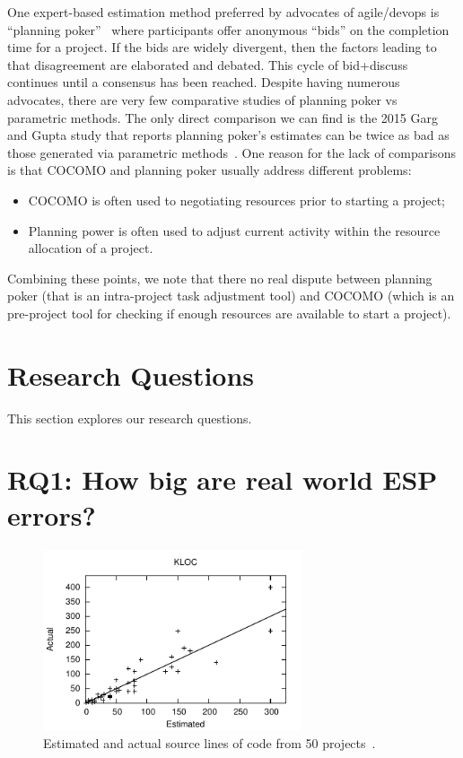 \documentclass[final,twocolumn]{elsarticle}
\newcommand{\bi}{\begin{itemize}[leftmargin=0.4cm]}
\newcommand{\ei}{\end{itemize}}
\theoremstyle{break}
\begin{document}
 One expert-based estimation method preferred by advocates of
 agile/devops is ``planning poker''~\cite{molokk08}
 where participants offer anonymous ``bids'' on the
 completion time for a project. If the bids are
 widely divergent, then the factors leading to that
 disagreement are elaborated and debated. This cycle
 of bid+discuss continues until a consensus has been
 reached.  Despite having numerous advocates,
 there are very few comparative studies of planning
 poker vs parametric methods. The only direct
 comparison we can find is the 2015 Garg and Gupta
 study that reports planning poker's estimates can be
 twice as bad as those generated via parametric
 methods~\cite{garg15}. One reason for the lack of
 comparisons is that COCOMO and planning poker
 usually address different problems: \bi
\item COCOMO is often used to negotiating resources prior to starting a project;
\item Planning power is often used to adjust current activity within the resource allocation of a project.
  \ei
  Combining these  points, we note that there no real dispute between planning poker (that is an intra-project
task adjustment tool) and COCOMO (which is an pre-project tool for checking if enough resources are available
to start a project).
 



\section{Research Questions}
This section explores our research questions.
\section{ RQ1: How big are real world ESP errors?}






\begin{figure}
\includegraphics[width=3in]{data.pdf}
\caption{Estimated and actual source lines of code from 50 projects~\cite{jones07a}.}\label{fig:ea}
\end{figure}
\end{document}
